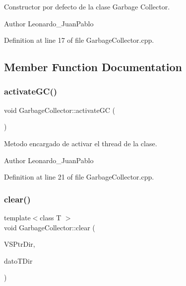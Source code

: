 Constructor por defecto de la clase Garbage Collector. 

\begin{DoxyAuthor}{Author}
Leonardo\+\_\+\+Juan\+Pablo 
\end{DoxyAuthor}


Definition at line 17 of file Garbage\+Collector.\+cpp.



\subsection{Member Function Documentation}
\mbox{\label{class_garbage_collector_a27c184268b99ce54d9dc41e0814761d3}} 
\subsubsection{\texorpdfstring{activate\+G\+C()}{activateGC()}}
{\footnotesize\ttfamily void Garbage\+Collector\+::activate\+GC (\begin{DoxyParamCaption}{ }\end{DoxyParamCaption})\hspace{0.3cm}{\ttfamily [static]}}



Metodo encargado de activar el thread de la clase. 

\begin{DoxyAuthor}{Author}
Leonardo\+\_\+\+Juan\+Pablo 
\end{DoxyAuthor}


Definition at line 21 of file Garbage\+Collector.\+cpp.

\mbox{\label{class_garbage_collector_a0e2f7b2ce7b6af3f3b1ee9b52d3d1b01}} 
\subsubsection{\texorpdfstring{clear()}{clear()}}
{\footnotesize\ttfamily template$<$class T $>$ \\
void Garbage\+Collector\+::clear (\begin{DoxyParamCaption}\item[{\hyperlink{class_v_s_ptr}{V\+S\+Ptr}$<$ T $>$ $\ast$}]{V\+S\+Ptr\+Dir,  }\item[{void $\ast$}]{dato\+T\+Dir }\end{DoxyParamCaption})\hspace{0.3cm}{\ttfamily [static]}}



